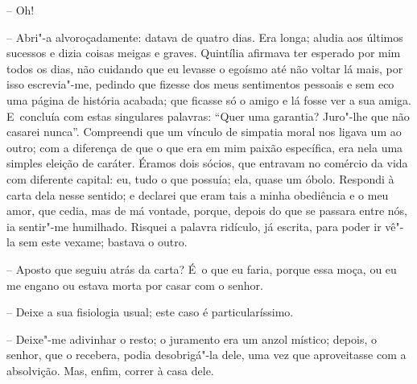 -- Oh!

-- Abri"-a alvoroçadamente: datava de quatro dias. Era longa; aludia aos
últimos sucessos e dizia coisas meigas e graves. Quintília afirmava ter
esperado por mim todos os dias, não cuidando que eu levasse o egoísmo
até não voltar lá mais, por isso escrevia"-me, pedindo que fizesse dos
meus sentimentos pessoais e sem eco uma página de história acabada; que
ficasse só o amigo e lá fosse ver a sua amiga. E~concluía com estas
singulares palavras: ``Quer uma garantia? Juro"-lhe que não casarei
nunca''. Compreendi que um vínculo de simpatia moral nos ligava um ao
outro; com a diferença de que o que era em mim paixão específica, era
nela uma simples eleição de caráter. Éramos dois sócios, que entravam no
comércio da vida com diferente capital: eu, tudo o que possuía; ela,
quase um óbolo. Respondi à carta dela nesse sentido; e declarei que eram
tais a minha obediência e o meu amor, que cedia, mas de má vontade,
porque, depois do que se passara entre nós, ia sentir"-me humilhado.
Risquei a palavra ridículo, já escrita, para poder ir vê"-la sem este
vexame; bastava o outro.

-- Aposto que seguiu atrás da carta? É~o que eu faria, porque essa moça,
ou eu me engano ou estava morta por casar com o senhor.

-- Deixe a sua fisiologia usual; este caso é particularíssimo.

-- Deixe"-me adivinhar o resto; o juramento era um anzol místico; depois,
o senhor, que o recebera, podia desobrigá"-la dele, uma vez que
aproveitasse com a absolvição. Mas, enfim, correr à casa dele.


